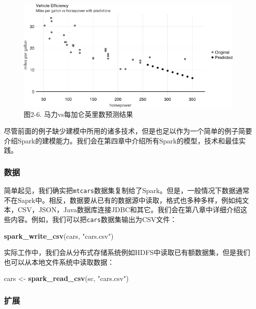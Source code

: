 \documentclass[
]{article}
\newenvironment{Shaded}{\begin{snugshade}}{\end{snugshade}}
\newcommand{\KeywordTok}[1]{\textcolor[rgb]{0.13,0.29,0.53}{\textbf{#1}}}
\newcommand{\NormalTok}[1]{#1}
\newcommand{\StringTok}[1]{\textcolor[rgb]{0.31,0.60,0.02}{#1}}
\begin{document}
\begin{figure}
\centering
\includegraphics{figures/2_6.png}
\caption{图2-6. 马力vs每加仑英里数预测结果}
\end{figure}

尽管前面的例子缺少建模中所用的诸多技术，但是也足以作为一个简单的例子简要介绍Spark的建模能力。我们会在第四章中介绍所有Spark的模型，技术和最佳实践。

\hypertarget{ux6570ux636e}{%
\subsubsection{数据}\label{ux6570ux636e}}

简单起见，我们确实把\texttt{mtcars}数据集复制给了Spark。但是，一般情况下数据通常不在Saprk中。相反，数据要从已有的数据源中读取，格式也多种多样，例如纯文本，CSV，JSON，Java数据库连接JDBC和其它。我们会在第八章中详细介绍这些内容。例如，我们可以把\texttt{cars}数据集输出为CSV文件：

\begin{Shaded}
\begin{Highlighting}[]
\KeywordTok{spark_write_csv}\NormalTok{(cars, }\StringTok{"cars.csv"}\NormalTok{)}
\end{Highlighting}
\end{Shaded}

实际工作中，我们会从分布式存储系统例如HDFS中读取已有额数据集，但是我们也可以从本地文件系统中读取数据：

\begin{Shaded}
\begin{Highlighting}[]
\NormalTok{cars <-}\StringTok{ }\KeywordTok{spark_read_csv}\NormalTok{(sc, }\StringTok{"cars.csv"}\NormalTok{)}
\end{Highlighting}
\end{Shaded}

\hypertarget{ux6269ux5c55}{%
\subsubsection{扩展}\label{ux6269ux5c55}}
\end{document}
